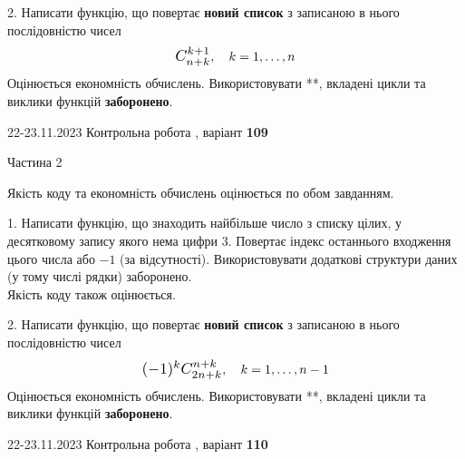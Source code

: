 \documentclass[12pt, ukrainian]{article}
\begin{document}
{{{{{{{{\begin {Large}
\vspace{10mm}



2. 
Написати функцію, що повертає \textbf{новий список} з записаною в нього послідовністю чисел
$$\scalebox{1.2}{$C_{n+k}^{k+1}$}, \quad k=1,\ldots,n$$
Оцінюється економність обчислень. Використовувати **, вкладені цикли та виклики функцій \textbf{заборонено}.

\end{Large}\newpage




\begin {Huge}
{{22-23.11.2023 Контрольна робота , варіант  \No \textbf { 109 }\par}}

\begin{center}Частина 2
\end{center}
\vspace{10mm}
\end {Huge}

{
\begin {Large}
Якість коду та економність обчислень оцінюється по обом завданням.

\vspace{5mm}

1. Написати функцію, що знаходить найбільше число з списку цілих, у десятковому запису якого нема цифри 3. Повертає індекс останнього входження цього числа або $-1$ (за відсутності). Використовувати додаткові структури даних (у тому числі рядки) заборонено.\\	Якість коду також оцінюється. 



\vspace{10mm}



2. 
Написати функцію, що повертає \textbf{новий список} з записаною в нього послідовністю чисел
$$\scalebox{1.2}{$(-1)^{k}C_{2n+k}^{n+k}$}, \quad k=1,\ldots,n-1$$
Оцінюється економність обчислень. Використовувати **, вкладені цикли та виклики функцій \textbf{заборонено}.

\end{Large}\newpage




\begin {Huge}
{{22-23.11.2023 Контрольна робота , варіант  \No \textbf { 110 }\par}}


\end{Huge}}}}}}}}}}
\end{document}
